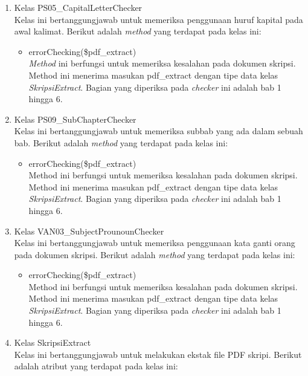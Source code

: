 \begin{enumerate}
	\item Kelas PS05\_CapitalLetterChecker \\
	Kelas ini bertanggungjawab untuk memeriksa penggunaan huruf kapital pada awal kalimat. Berikut adalah \textit{method} yang terdapat pada kelas ini:
		
		\begin{itemize}
			\item errorChecking(\$pdf\_extract) \\
			\textit{Method} ini berfungsi untuk memeriksa kesalahan pada dokumen skripsi. Method ini menerima masukan pdf\_extract dengan tipe data kelas \textit{SkripsiExtract}. Bagian yang diperiksa pada \textit{checker} ini adalah bab 1 hingga 6.
		\end{itemize}
			
	\item Kelas PS09\_SubChapterChecker \\
	Kelas ini bertanggungjawab untuk memeriksa subbab yang ada dalam sebuah bab. Berikut adalah \textit{method} yang terdapat pada kelas ini:
			
		\begin{itemize}
			\item errorChecking(\$pdf\_extract) \\
			Method ini berfungsi untuk memeriksa kesalahan pada dokumen skripsi. Method ini menerima masukan pdf\_extract dengan tipe data kelas \textit{SkripsiExtract}. Bagian yang diperiksa pada \textit{checker} ini adalah bab 1 hingga 6.
		\end{itemize}
			
	\item Kelas VAN03\_SubjectProunounChecker \\
	Kelas ini bertanggungjawab untuk memeriksa penggunaan kata ganti orang pada dokumen skripsi. Berikut adalah \textit{method} yang terdapat pada kelas ini:
	
		\begin{itemize}
			\item errorChecking(\$pdf\_extract) \\
			Method ini berfungsi untuk memeriksa kesalahan pada dokumen skripsi. Method ini menerima masukan pdf\_extract dengan tipe data kelas \textit{SkripsiExtract}. Bagian yang diperiksa pada \textit{checker} ini adalah bab 1 hingga 6.
		\end{itemize}
			
	\item Kelas SkripsiExtract \\
	Kelas ini bertanggungjawab untuk melakukan ekstak file PDF skripi. Berikut adalah atribut yang terdapat pada kelas ini:
	

\end{enumerate}
